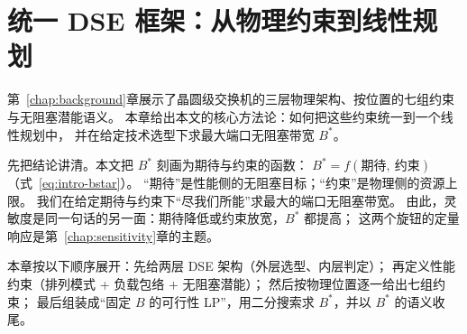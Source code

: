 \chapter{统一 DSE 框架：从物理约束到线性规划}\label{chap:overview}

第~\ref{chap:background}章展示了晶圆级交换机的三层物理架构、按位置的七组约束与无阻塞潜能语义。
本章给出本文的核心方法论：如何把这些约束统一到一个线性规划中，
并在给定技术选型下求最大端口无阻塞带宽 $B^*$。

先把结论讲清。本文把 $B^*$ 刻画为期待与约束的函数：
$B^* = f(\text{期待},\ \text{约束})$（式~\eqref{eq:intro-bstar}）。
``期待''是性能侧的无阻塞目标；``约束''是物理侧的资源上限。
我们在给定期待与约束下``尽我们所能''求最大的端口无阻塞带宽。
由此，灵敏度是同一句话的另一面：期待降低或约束放宽，$B^*$ 都提高；
这两个旋钮的定量响应是第~\ref{chap:sensitivity}章的主题。

本章按以下顺序展开：先给两层 DSE 架构（外层选型、内层判定）；
再定义性能约束（排列模式 + 负载包络 + 无阻塞潜能）；
然后按物理位置逐一给出七组约束；
最后组装成``固定 $B$ 的可行性 LP''，用二分搜索求 $B^*$，并以 $B^*$ 的语义收尾。






